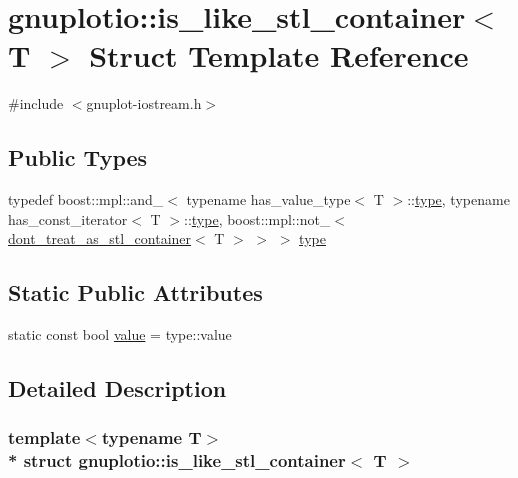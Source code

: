 \hypertarget{structgnuplotio_1_1is__like__stl__container}{}\section{gnuplotio\+:\+:is\+\_\+like\+\_\+stl\+\_\+container$<$ T $>$ Struct Template Reference}
\label{structgnuplotio_1_1is__like__stl__container}


{\ttfamily \#include $<$gnuplot-\/iostream.\+h$>$}

\subsection*{Public Types}
\begin{DoxyCompactItemize}
\item 
typedef boost\+::mpl\+::and\+\_\+$<$ typename has\+\_\+value\+\_\+type$<$ T $>$\+::\hyperlink{structgnuplotio_1_1is__like__stl__container_a050ecfa55e896a27f86d901334f47c6a}{type}, typename has\+\_\+const\+\_\+iterator$<$ T $>$\+::\hyperlink{structgnuplotio_1_1is__like__stl__container_a050ecfa55e896a27f86d901334f47c6a}{type}, boost\+::mpl\+::not\+\_\+$<$ \hyperlink{structgnuplotio_1_1dont__treat__as__stl__container}{dont\+\_\+treat\+\_\+as\+\_\+stl\+\_\+container}$<$ T $>$ $>$ $>$ \hyperlink{structgnuplotio_1_1is__like__stl__container_a050ecfa55e896a27f86d901334f47c6a}{type}
\end{DoxyCompactItemize}
\subsection*{Static Public Attributes}
\begin{DoxyCompactItemize}
\item 
static const bool \hyperlink{structgnuplotio_1_1is__like__stl__container_ae4761e6e807deed732e41118c785c8a4}{value} = type\+::value
\end{DoxyCompactItemize}


\subsection{Detailed Description}
\subsubsection*{template$<$typename T$>$\\*
struct gnuplotio\+::is\+\_\+like\+\_\+stl\+\_\+container$<$ T $>$}



